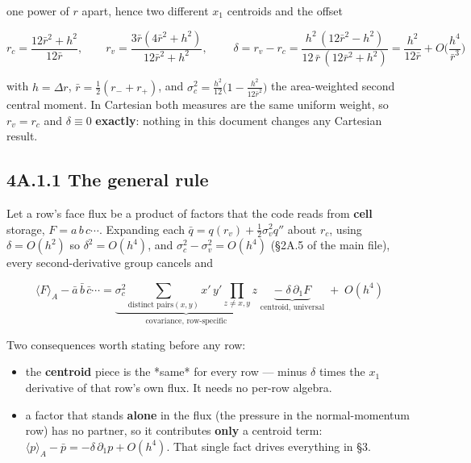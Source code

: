 \documentclass[11pt,a4paper]{article}
\begin{document}
one power of $r$ apart, hence two different $x_1$ centroids and the offset

\begin{equation*}
r_c=\frac{12\bar r^2+h^2}{12\bar r},\qquad
r_v=\frac{3\bar r(4\bar r^2+h^2)}{12\bar r^2+h^2},\qquad
\boxed{\;\delta=r_v-r_c=\frac{h^2\,(12\bar r^2-h^2)}{12\,\bar r\,(12\bar r^2+h^2)}
=\frac{h^2}{12\bar r}+O\!\Big(\frac{h^4}{\bar r^3}\Big)}
\tag{1.1}
\end{equation*}

with $h=\Delta r$, $\bar r=\tfrac12(r_-+r_+)$, and
$\sigma_c^2=\tfrac{h^2}{12}\big(1-\tfrac{h^2}{12\bar r^2}\big)$ the area-weighted
second central moment. In Cartesian both measures are the same uniform weight,
so $r_v=r_c$ and $\delta\equiv0$ \textbf{exactly}: nothing in this document changes
any Cartesian result.

\subsection*{4A.1.1 The general rule}

Let a row's face flux be a product of factors that the code reads from \textbf{cell}
storage, $F=a\,b\,c\cdots$. Expanding each $\bar q = q(r_v)+\tfrac12\sigma_v^2q''$
about $r_c$, using $\delta=O(h^2)$ so $\delta^2=O(h^4)$, and
$\sigma_c^2-\sigma_v^2=O(h^4)$ (§2A.5 of the main file), every second-derivative
group cancels and

\begin{equation*}
\boxed{\;
\big\langle F\big\rangle_A-\bar a\,\bar b\,\bar c\cdots
=\underbrace{\sigma_c^2\!\!\sum_{\text{distinct pairs}(x,y)}\!\! x'\,y'\!\!\prod_{z\neq x,y}\! z}_{\text{covariance, row-specific}}
\;\underbrace{-\;\delta\,\partial_1 F}_{\text{centroid, universal}}
\;+\;O(h^4)\;}
\tag{1.2}
\end{equation*}

Two consequences worth stating before any row:

\begin{itemize}
\item the \textbf{centroid} piece is the *same* for every row — minus $\delta$ times the
  $x_1$ derivative of that row's own flux. It needs no per-row algebra.
\item a factor that stands \textbf{alone} in the flux (the pressure in the normal-momentum
  row) has no partner, so it contributes \textbf{only} a centroid term:
  $\langle p\rangle_A-\bar p=-\delta\,\partial_1p+O(h^4)$. That single fact drives
  everything in §3.
\end{itemize}
\end{document}

